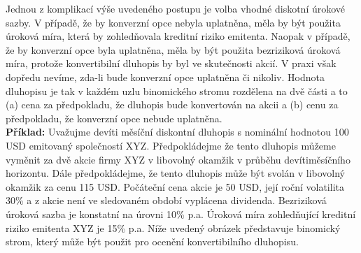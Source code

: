 \documentclass[a4paper]{book}
\begin{document}
Jednou z komplikací výše uvedeného postupu je volba vhodné diskotní úrokové sazby. V případě, že by konverzní opce nebyla uplatněna, měla by být použita úroková míra, která by zohledňovala kreditní riziko emitenta. Naopak v případě, že by konverzní opce byla uplatněna, měla by být použita bezriziková úroková míra, protože konvertibilní dluhopis by byl ve skutečnosti akcií. V praxi však dopředu nevíme, zda-li bude konverzní opce uplatněna či nikoliv. Hodnota dluhopisu je tak v každém uzlu binomického stromu rozdělena na dvě části a to (a) cena za předpokladu, že dluhopis bude konvertován na akcii a (b) cenu za předpokladu, že konverzní opce nebude uplatněna.\\

\noindent \textbf{Příklad:} Uvažujme devíti měsíční diskontní dluhopis s nominální hodnotou 100 USD emitovaný společností XYZ. Předpokládejme že tento dluhopis můžeme vyměnit za dvě akcie firmy XYZ v libovolný okamžik v průběhu devítiměsíčního horizontu. Dále předpokládejme, že tento dluhopis může být svolán v libovolný okamžik za cenu 115 USD. Počáteční cena akcie je 50 USD, její roční volatilita 30\% a z akcie není ve sledovaném období vyplácena dividenda. Bezriziková úroková sazba je konstatní na úrovni 10\% p.a. Úroková míra zohledňující kreditní riziko emitenta XYZ je 15\% p.a. Níže uvedený obrázek představuje binomický strom, který může být použit pro ocenění konvertibilního dluhopisu.
\end{document}
